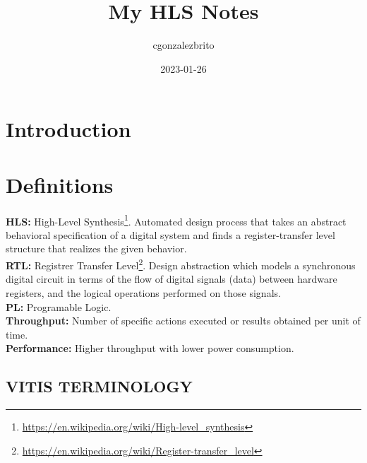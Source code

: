 \documentclass{article}
\title{My HLS Notes}
\date{2023-01-26}
\author{cgonzalezbrito}
\begin{document}
  \maketitle
  \newpage
  \section{Introduction}
  
  \iffalse TODO: \fi

  \section{Definitions}

  \textbf{HLS:} High-Level Synthesis\footnote{\label{HLS}\url{https://en.wikipedia.org/wiki/High-level_synthesis}}. Automated design process that takes an abstract behavioral specification of a digital system and finds a register-transfer level structure that realizes the given behavior.\\
  \textbf{RTL:} Registrer Transfer Level\footnote{\label{RTL}\url{https://en.wikipedia.org/wiki/Register-transfer_level}}. Design abstraction which models a synchronous digital circuit in terms of the flow of digital signals (data) between hardware registers, and the logical operations performed on those signals.\\
  \textbf{PL:} Programable Logic.\\
  \textbf{Throughput:} Number of specific actions executed or results obtained per unit of time.\\
  \textbf{Performance:} Higher throughput with lower power consumption.\\

  \subsection{VITIS TERMINOLOGY}
\end{document}
